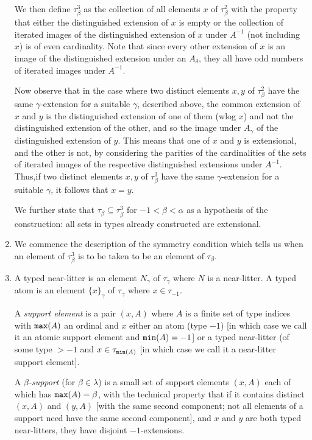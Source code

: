 \documentclass[12pt]{article}
\begin{document}
\begin{enumerate}
We then define $\tau^3_\beta$ as the collection of all elements $x$ of $\tau^2_\beta$ with the property that either the distinguished extension of $x$ is empty or the collection of iterated images of the distinguished extension of
$x$ under $A^{-1}$ (not including $x$) is of even cardinality.  Note that since every other extension of $x$ is an image of the distinguished extension under an $A_\delta$, they all have odd numbers of iterated images under $A^{-1}$.  

Now observe that in the case where two distinct elements $x,y$ of $\tau^2_\beta$ have the same $\gamma$-extension for a suitable $\gamma$, described above,
the common extension of $x$ and $y$ is the distinguished extension of one of them (wlog $x$) and not the distinguished extension of the other, and so the image under $A_\gamma$ of the distinguished extension of $y$.  This means that one of $x$ and $y$ is extensional, and the other is not, by considering the parities of the cardinalities of the sets of iterated images of the respective distinguished extensions under $A^{-1}$.  Thus,if  two distinct elements $x,y$ of $\tau^3_\beta$ have the same $\gamma$-extension for a suitable $\gamma$, it follows that $x=y$.

We further state that $\tau_\beta \subseteq \tau^3_\beta$ for $-1 < \beta < \alpha$ as a hypothesis of the construction:  all sets in types already constructed are extensional.

\item  We commence the description of the symmetry condition which tells us when an element of $\tau^3_\beta$ is to be taken to be an element of $\tau_\beta$.

\item  A typed near-litter is an element $N_\gamma$ of $\tau_\gamma$ where $N$ is a near-litter.  A typed atom is an element $\{x\}_\gamma$ of $\tau_\gamma$ where
$x \in \tau_{-1}$.

A {\em support element\/} is a pair $(x,A)$ where $A$ is a finite set of type indices with ${\tt max}(A)$ an ordinal and  $x$ either an atom (type $-1$) [in which case we call it an atomic support element and ${\tt min}(A) =-1$] or a typed near-litter (of some type $>-1$ and $x \in \tau_{{\tt min}(A)}$ [in which case we call it a near-litter support element].

A {\em $\beta$-support\/} (for $\beta \in \lambda$) is a small set of support elements $(x,A)$ each of which has ${\tt max}(A)=\beta$, with the technical property that if it contains distinct $(x,A)$ and $(y,A)$ [with the same second component;  not all elements of a support need have the same second component], and $x$ and $y$ are both typed near-litters, they have disjoint $-1$-extensions.


\end{enumerate}
\end{document}

